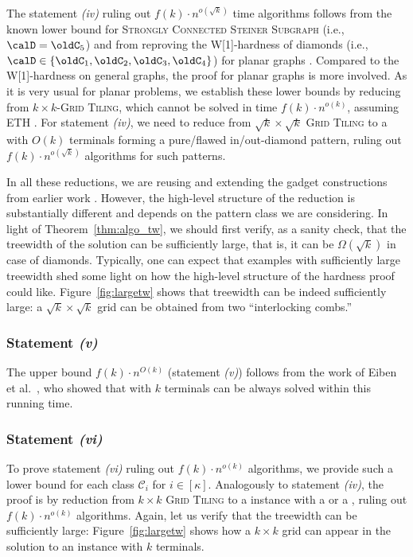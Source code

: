   The statement \textit{(iv)} ruling out   $f(k) \cdot n^{o(\sqrt{k})}$ time algorithms follows from the known lower bound for \textsc{Strongly Connected Steiner Subgraph} (i.e., $\calD=\oldC_5$) \cite{ChitnisFHM20} and from reproving the W[1]-hardness of diamonds (i.e., $\calD\in \{\oldC_1,\oldC_2,\oldC_3,\oldC_4\}$) for planar graphs \cite{FeldmannM16}. Compared to the W[1]-hardness on general graphs, the proof for planar graphs is more involved. As it is very usual for planar problems, we establish these lower bounds by reducing from \textsc{$k\times k$-Grid Tiling}, which cannot be solved in time $f(k) \cdot n^{o(k)}$, assuming ETH \cite{10.5555/2815661}. For statement \textit{(iv)}, we need to reduce from \textsc{$\sqrt{k}\times \sqrt{k}$ Grid Tiling} to a \dsn with $O(k)$ terminals forming a pure/flawed in/out-diamond pattern, ruling out $f(k) \cdot n^{o(\sqrt{k})}$ algorithms for such patterns.

  In all these reductions, we are reusing and extending the gadget constructions from earlier work \cite{ChitnisFHM20}. However, the high-level structure of the reduction is substantially different and depends on the pattern class we are considering. In light of Theorem~\ref{thm:algo_tw}, we should first verify, as a sanity check, that the treewidth of the solution can be sufficiently large, that is, it can be $\Omega(\sqrt{k})$ in case of diamonds.
   Typically, one can expect that examples with sufficiently large treewidth shed some light on how the high-level structure of the hardness proof could like.
   Figure~\ref{fig:largetw} shows that treewidth can be indeed sufficiently large: a $\sqrt{k}\times\sqrt{k}$ grid can be obtained from two ``interlocking combs.''

   \subsubsection*{Statement \textit{(v)}}

 The upper bound $f(k) \cdot n^{O(k)}$ (statement \textit{(v)}) follows from the work of Eiben et al.~\cite{eiben_et_al}, who showed that \dsn with $k$ terminals can be always solved within this running time.

 \subsubsection*{Statement \textit{(vi)}}

 To prove statement \textit{(vi)} ruling out $f(k) \cdot n^{o(k)}$ algorithms, we provide such a lower bound for each class $\mathcal{C}_i$ for $i\in [\kappa]$. Analogously to statement \textit{(iv)}, the proof is by reduction from \textsc{$k\times k$ Grid Tiling} to a \dsn instance with a 
 or a , ruling out $f(k) \cdot n^{o(k)}$ algorithms. Again, let us verify that the treewidth can be sufficiently large: Figure~\ref{fig:largetw} shows how a $k\times k$ grid can appear in the solution to an instance with $k$ terminals.
 
